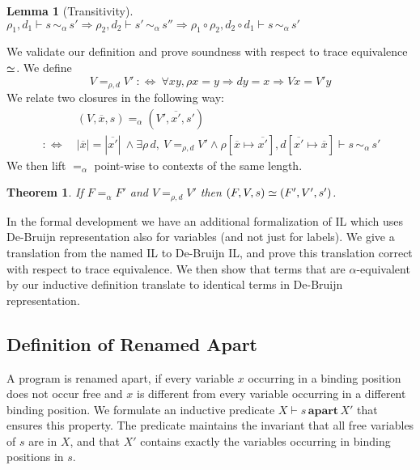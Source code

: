 \documentclass[openright,a4paper,11pt]{scrartcl}
\newcommand{\slist}[1]{\ensuremath{\overline{#1}}}
\newcommand{\alphai}[4]{\ensuremath{#1,#2\vdash#3 \,\sim_\alpha\, #4}}
\newcommand{\rmp}{\ensuremath{\rho}}
\newcommand{\rmpp}{\ensuremath{d}}
\theoremstyle{plain}
\newtheorem{theorem}{Theorem}
\theoremstyle{plain}
\newtheorem{lemma}{Lemma}
\theoremstyle{plain}
\theoremstyle{plain}
\theoremstyle{nonumberplain}
\begin{document}
\begin{lemma}[Transitivity]
$\alphai{\rmp_1}{\rmpp_1}{s}{s'}\Rightarrow \alphai{\rmp_2}{\rmpp_2}{s'}{s''} \Rightarrow
\alphai{\rmp_1\circ\rmp_2}{\rmpp_2\circ\rmpp_1}{s}{s'}
$
\end{lemma}


We validate our definition and prove soundness with respect to trace equivalence $\simeq$.
We define $$V =_{\rmp,\rmpp} V' ~:\!\iff~ \forall x y, \rmp x = y \Rightarrow \rmpp y = x \Rightarrow V x = V' y$$
We relate two closures in the following way:
\begin{align*}
 &(V,\slist{x},s) =_\alpha (V',\slist{x'},s')
\\ ~:\!\iff~ &|\slist{x}| = |\slist{x'}| ~\land \exists \rmp\, \rmpp,~ V =_{\rmp,\rmpp} V' \land \alphai{\rmp[\slist{x}\mapsto\slist{x'}]}{\rmpp[\slist{x'}\mapsto\slist{x}]}{s}{s'}
\end{align*}
We then lift $=_\alpha$ point-wise to contexts of the same length.

\begin{theorem}
If $F =_\alpha F'$ and $V =_{\rmp,\rmpp} V'$
then $(F,V,s)\simeq(F',V',s')$.
\end{theorem}

In the formal development we have an additional formalization of IL which uses De-Bruijn representation also for variables (and not just for labels).
We give a translation from the named IL to De-Bruijn IL, and prove this translation correct with respect to trace equivalence.
We then show that terms that are $\alpha$-equivalent by our inductive definition translate to identical terms in De-Bruijn representation.










 \newcommand{\apart}[3]{\ensuremath{#1\vdash#2\,\textbf{apart}\, #3}}

\newcommand{\vs}{\ensuremath{X}}

\subsection{Definition of Renamed Apart}
\label{sec:renamedapart}
A program is renamed apart, if every variable $x$ occurring in a binding position does not occur free and $x$ is different from every variable occurring in a different binding position.
We formulate an inductive predicate \apart{\vs}{s}{\vs'} that ensures this property.
The predicate maintains the invariant that all free variables of $s$ are in $\vs$,
and that $\vs'$ contains exactly the variables occurring in binding positions in $s$.
\end{document}
